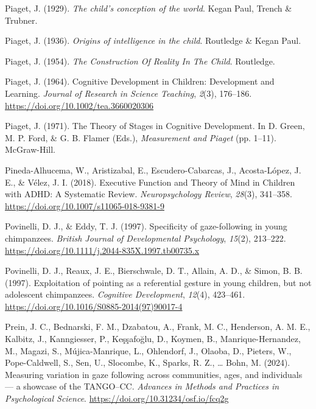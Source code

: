 \documentclass[
]{scrbook}
\newlength{\cslhangindent}
\newenvironment{CSLReferences}[2] %
 {\begin{list}{}{%
  \setlength{\itemindent}{0pt}
  \setlength{\leftmargin}{0pt}
  \setlength{\parsep}{0pt}
  \ifodd #1
   \setlength{\leftmargin}{\cslhangindent}
   \setlength{\itemindent}{-1\cslhangindent}
  \fi
  \setlength{\itemsep}{#2\baselineskip}}}
 {\end{list}}
\begin{document}
\begin{CSLReferences}{1}{0}
Piaget, J. (1929). \emph{The child's conception of the world}. Kegan Paul, Trench \& Trubner.

Piaget, J. (1936). \emph{Origins of intelligence in the child}. Routledge \& Kegan Paul.

Piaget, J. (1954). \emph{The {Construction Of Reality In The Child}}. Routledge.

Piaget, J. (1964). Cognitive {Development} in {Children}: {Development} and {Learning}. \emph{Journal of Research in Science Teaching}, \emph{2}(3), 176--186. \url{https://doi.org/10.1002/tea.3660020306}

Piaget, J. (1971). The {Theory} of {Stages} in {Cognitive Development}. In D. Green, M. P. Ford, \& G. B. Flamer (Eds.), \emph{Measurement and {Piaget}} (pp. 1--11). McGraw-Hill.

Pineda-Alhucema, W., Aristizabal, E., Escudero-Cabarcas, J., Acosta-López, J. E., \& Vélez, J. I. (2018). Executive {Function} and {Theory} of {Mind} in {Children} with {ADHD}: A {Systematic Review}. \emph{Neuropsychology Review}, \emph{28}(3), 341--358. \url{https://doi.org/10.1007/s11065-018-9381-9}

Povinelli, D. J., \& Eddy, T. J. (1997). Specificity of gaze-following in young chimpanzees. \emph{British Journal of Developmental Psychology}, \emph{15}(2), 213--222. \url{https://doi.org/10.1111/j.2044-835X.1997.tb00735.x}

Povinelli, D. J., Reaux, J. E., Bierschwale, D. T., Allain, A. D., \& Simon, B. B. (1997). Exploitation of pointing as a referential gesture in young children, but not adolescent chimpanzees. \emph{Cognitive Development}, \emph{12}(4), 423--461. \url{https://doi.org/10.1016/S0885-2014(97)90017-4}

Prein, J. C., Bednarski, F. M., Dzabatou, A., Frank, M. C., Henderson, A. M. E., Kalbitz, J., Kanngiesser, P., Keşşafoğlu, D., Koymen, B., Manrique-Hernandez, M., Magazi, S., Mújica-Manrique, L., Ohlendorf, J., Olaoba, D., Pieters, W., Pope-Caldwell, S., Sen, U., Slocombe, K., Sparks, R. Z., \ldots{} Bohn, M. (2024). Measuring variation in gaze following across communities, ages, and individuals --- a showcase of the {TANGO}--{CC}. \emph{Advances in Methods and Practices in Psychological Science}. \url{https://doi.org/10.31234/osf.io/fcq2g}


\end{CSLReferences}
\end{document}

